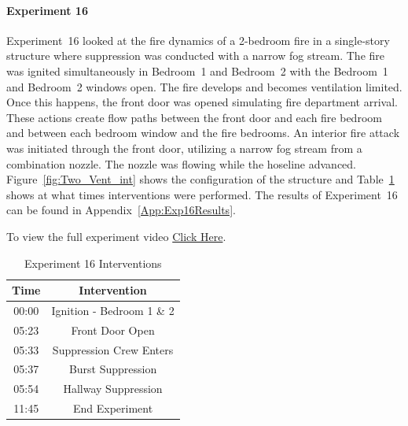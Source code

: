 \documentclass[12pt,oneside]{book}
\begin{document}
\paragraph{Experiment 16}
Experiment~16 looked at the fire dynamics of a 2-bedroom fire in a single-story structure where suppression was conducted with a narrow fog stream. The fire was ignited simultaneously in Bedroom~1 and Bedroom~2 with the Bedroom~1 and Bedroom~2 windows open. The fire develops and becomes ventilation limited. Once this happens, the front door was opened simulating fire department arrival. These actions create flow paths between the front door and each fire bedroom and between each bedroom window and the fire bedrooms. An interior fire attack was initiated through the front door, utilizing a narrow fog stream from a combination nozzle. The nozzle was flowing while the hoseline advanced. Figure~\ref{fig:Two_Vent_int} shows the configuration of the structure and Table~\ref{Table:Exp16Interventions} shows at what times interventions were performed. The results of Experiment~16 can be found in Appendix~\ref{App:Exp16Results}. 

To view the full experiment video \href{https://player.vimeo.com/video/170510941?autoplay=1}{Click Here}.

\begin{table}[H]
	\centering
	\caption{Experiment 16 Interventions}
	\begin{tabular}{|c|c|} 
		\hline
		Time & Intervention \\ \hline \hline
		00:00 & Ignition - Bedroom 1 \& 2 \\ \hline
		05:23 & Front Door Open \\ \hline
		05:33 & Suppression Crew Enters\\ \hline
		05:37 & Burst Suppression \\ \hline 
		05:54 & Hallway Suppression \\ \hline
		11:45 & End Experiment\\ \hline
	\end{tabular}
	\label{Table:Exp16Interventions}
\end{table}

\FloatBarrier
\end{document}

